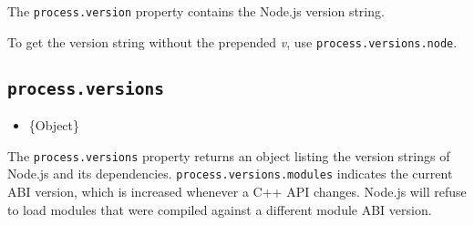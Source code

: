 The \texttt{process.version} property contains the Node.js version
string.

\begin{Shaded}
\begin{Highlighting}[]
 \OperatorTok{;}

\NormalTok{(}\SpecialCharTok{$\{}\SpecialCharTok{\}}\VerbatimStringTok{\textasciigrave{}}\NormalTok{)}\OperatorTok{;}
\end{Highlighting}
\end{Shaded}

\begin{Shaded}
\begin{Highlighting}[]
\OperatorTok{=} \NormalTok{(}\NormalTok{)}\OperatorTok{;}

\NormalTok{(}\SpecialCharTok{$\{}\SpecialCharTok{\}}\VerbatimStringTok{\textasciigrave{}}\NormalTok{)}\OperatorTok{;}
\end{Highlighting}
\end{Shaded}

To get the version string without the prepended \emph{v}, use
\texttt{process.versions.node}.

\subsection{\texorpdfstring{\texttt{process.versions}}{process.versions}}\label{process.versions}

\begin{itemize}
\tightlist
\item
  \{Object\}
\end{itemize}

The \texttt{process.versions} property returns an object listing the
version strings of Node.js and its dependencies.
\texttt{process.versions.modules} indicates the current ABI version,
which is increased whenever a C++ API changes. Node.js will refuse to
load modules that were compiled against a different module ABI version.

